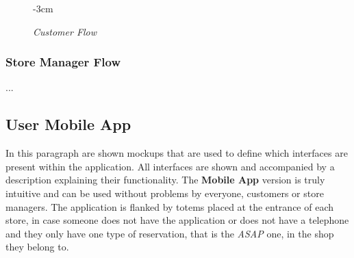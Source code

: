 \documentclass{article}
\begin{document}
\begin{figure}[H]
\begin{adjustwidth} {-3cm}{}
				\end{adjustwidth}
				\caption{\emph{Customer Flow}}
			\end{figure}
		\newpage
		\subsubsection{Store Manager Flow}
		...

	\subsection{User Mobile App}
	In this paragraph are shown mockups that are used to define which interfaces are present within the application. All interfaces are shown and accompanied by a description explaining their functionality. The {\bfseries Mobile App} version is truly intuitive and can be used without problems by everyone, customers or store managers. The application is flanked by totems placed at the entrance of each store, in case someone does not have the application or does not have a telephone and they only have one type of reservation, that is the \emph{ASAP} one, in the shop they belong to.
	\newpage
\end{document}
